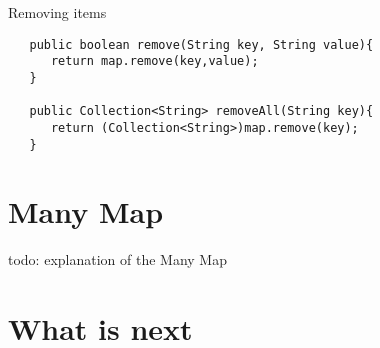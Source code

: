 Removing items

\begin{verbatim}
   public boolean remove(String key, String value){
      return map.remove(key,value);
   }

   public Collection<String> removeAll(String key){
      return (Collection<String>)map.remove(key);
   }
\end{verbatim}

\section{Many Map}

todo: explanation of the Many Map



\section{What is next}

